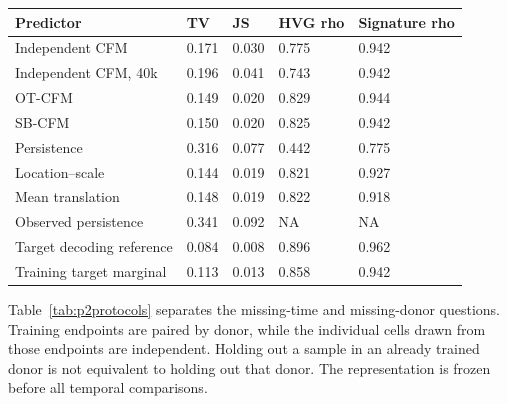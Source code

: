 \documentclass[10pt,a4paper]{article}
\begin{document}
{{\begin{longtable}{@{}p{67mm}p{21mm}p{21mm}p{25mm}p{27mm}@{}}
\toprule
Predictor & TV & JS & HVG rho & Signature rho\\\midrule\endhead
\bottomrule\endfoot
Independent CFM & 0.171 & 0.030 & 0.775 & 0.942\\
Independent CFM, 40k & 0.196 & 0.041 & 0.743 & 0.942\\
OT-CFM & 0.149 & 0.020 & 0.829 & 0.944\\
SB-CFM & 0.150 & 0.020 & 0.825 & 0.942\\
Persistence & 0.316 & 0.077 & 0.442 & 0.775\\
Location--scale & 0.144 & 0.019 & 0.821 & 0.927\\
Mean translation & 0.148 & 0.019 & 0.822 & 0.918\\
Observed persistence & 0.341 & 0.092 & NA & NA\\
Target decoding reference & 0.084 & 0.008 & 0.896 & 0.962\\
Training target marginal & 0.113 & 0.013 & 0.858 & 0.942\\
\end{longtable}
}
}
Table~\ref{tab:p2protocols} separates the missing-time and missing-donor questions. Training endpoints are paired by donor, while the individual cells drawn from those endpoints are independent. Holding out a sample in an already trained donor is not equivalent to holding out that donor. The representation is frozen before all temporal comparisons.
\end{document}

